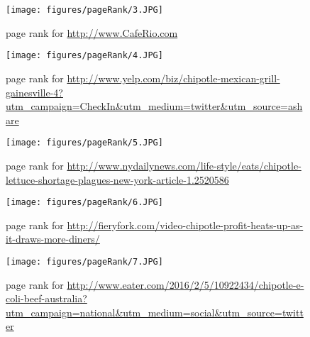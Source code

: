 \begin{figure}[h!]
\begin{center}
\hspace*{-1.5in}
\texttt{[image: figures/pageRank/3.JPG]}
\caption{page rank for {\url{http://www.CafeRio.com }}}
\label{fig:q3fig3}
\end{center}
\end{figure}

\begin{figure}[h!]
\begin{center}
\hspace*{-1.5in}
\texttt{[image: figures/pageRank/4.JPG]}
\caption{page rank for {\url{http://www.yelp.com/biz/chipotle-mexican-grill-gainesville-4?utm_campaign=CheckIn&utm_medium=twitter&utm_source=ashare}}}
\label{fig:q3fig4}
\end{center}
\end{figure}

\begin{figure}[h!]
\begin{center}
\hspace*{-1.5in}
\texttt{[image: figures/pageRank/5.JPG]}
\caption{page rank for {\url{http://www.nydailynews.com/life-style/eats/chipotle-lettuce-shortage-plagues-new-york-article-1.2520586}}}
\label{fig:q3fig5}
\end{center}
\end{figure}

\begin{figure}[h!]
\begin{center}
\hspace*{-1.5in}
\texttt{[image: figures/pageRank/6.JPG]}
\caption{page rank for {\url{http://fieryfork.com/video-chipotle-profit-heats-up-as-it-draws-more-diners/}}}
\label{fig:q3fig6}
\end{center}
\end{figure}

\begin{figure}[h!]
\begin{center}
\hspace*{-1.5in}
\texttt{[image: figures/pageRank/7.JPG]}
\caption{page rank for {\url{http://www.eater.com/2016/2/5/10922434/chipotle-e-coli-beef-australia?utm_campaign=national&utm_medium=social&utm_source=twitter}}}
\label{fig:q3fig7}
\end{center}
\end{figure}

